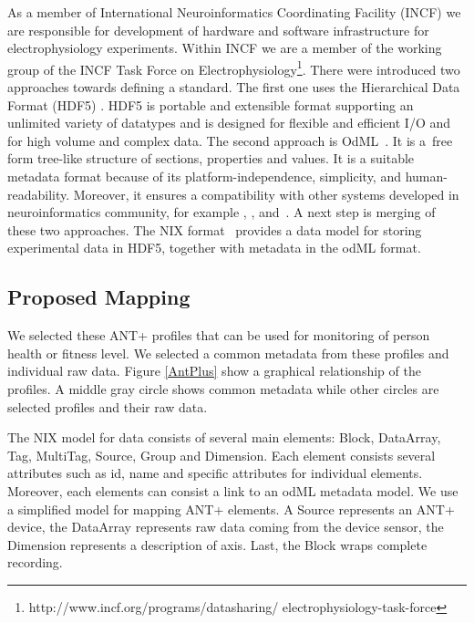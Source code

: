 \documentclass[conference]{IEEEconf}
\begin{document}
As a member of International Neuroinformatics Coordinating Facility (INCF) \cite{wvangeit:Bjaalie:JNeurosci:2007} we are responsible for development of hardware and software infrastructure for electrophysiology experiments. Within INCF we are a member of the working group of the INCF Task Force on Electrophysiology\footnote{http://www.incf.org/programs/datasharing/ electrophysiology-task-force}. There were introduced two approaches towards defining a standard. The first one uses the Hierarchical Data Format (HDF5) \cite{hdf5}. HDF5 is portable and extensible format supporting an unlimited variety of datatypes and is designed for flexible and efficient I/O and for high volume and complex data. The second approach is OdML~\cite{10.3389/fninf.2011.00016}. It is a~free form tree-like structure of sections, properties and values. It is a suitable metadata format because of its platform-independence, simplicity, and human-readability. Moreover, it ensures a compatibility with other systems developed in neuroinformatics community, for example \cite{10.3389/conf.fninf.2014.18.00029}, \cite{10.3389/conf.fninf.2014.18.00053}, and~\cite{10.3389/conf.fninf.2013.09.00025}. A next step is merging of these two approaches\cite{10.3389/conf.fninf.2013.09.00069}. The NIX format~\cite{Stoewer:2014} provides a data model for storing experimental data in HDF5, together with metadata in the odML format.




\subsection{Proposed Mapping}

We selected these ANT+ profiles that can be used for monitoring of person health or fitness level. We selected a common metadata from these profiles and individual raw data. Figure \ref{AntPlus} show a graphical relationship of the profiles. A middle gray circle shows common metadata while other circles are selected profiles and their raw data. 


The NIX model for data consists of several main elements: Block, DataArray, Tag, MultiTag, Source, Group and Dimension. Each element consists several attributes such as id, name and specific attributes for individual elements. Moreover, each elements can consist a link to an odML metadata model. We use a simplified model for mapping ANT+ elements. A Source represents an ANT+ device, the DataArray represents raw data coming from the device sensor, the Dimension represents a description of axis. Last, the Block wraps complete recording.
\end{document}
